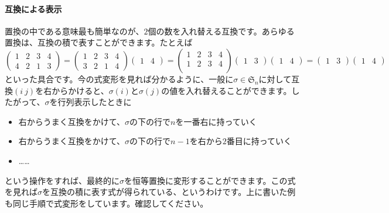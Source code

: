\paragraph{互換による表示}

置換の中である意味最も簡単なのが、$2$個の数を入れ替える互換です。あらゆる置換は、互換の積で表すことができます。たとえば
\[
\begin{pmatrix}
1 & 2 & 3 & 4 \\
4 & 2 & 1 & 3
\end{pmatrix}
= 
\begin{pmatrix}
1 & 2 & 3 & 4 \\
3 & 2 & 1 & 4
\end{pmatrix}
\begin{pmatrix}
1 & 4
\end{pmatrix}
=
\begin{pmatrix}
1 & 2 & 3 & 4 \\
1 & 2 & 3 & 4 \\
\end{pmatrix}
\begin{pmatrix}
1 & 3
\end{pmatrix}
\begin{pmatrix}
1 & 4
\end{pmatrix}
=
\begin{pmatrix}
1 & 3
\end{pmatrix}
\begin{pmatrix}
1 & 4
\end{pmatrix}
\]
といった具合です。今の式変形を見れば分かるように、一般に$\sigma \in \mathfrak{S}_n$に対して互換$(i\ j)$を右からかけると、$\sigma(i)$と$\sigma(j)$の値を入れ替えることができます。したがって、$\sigma$を行列表示したときに
\begin{itemize}
\item 右からうまく互換をかけて、$\sigma$の下の行で$n$を一番右に持っていく
\item 右からうまく互換をかけて、$\sigma$の下の行で$n - 1$を右から$2$番目に持っていく
\item ……
\end{itemize}
という操作をすれば、最終的に$\sigma$を恒等置換に変形することができます。この式を見れば$\sigma$を互換の積に表す式が得られている、というわけです。上に書いた例も同じ手順で式変形をしています。確認してください。

